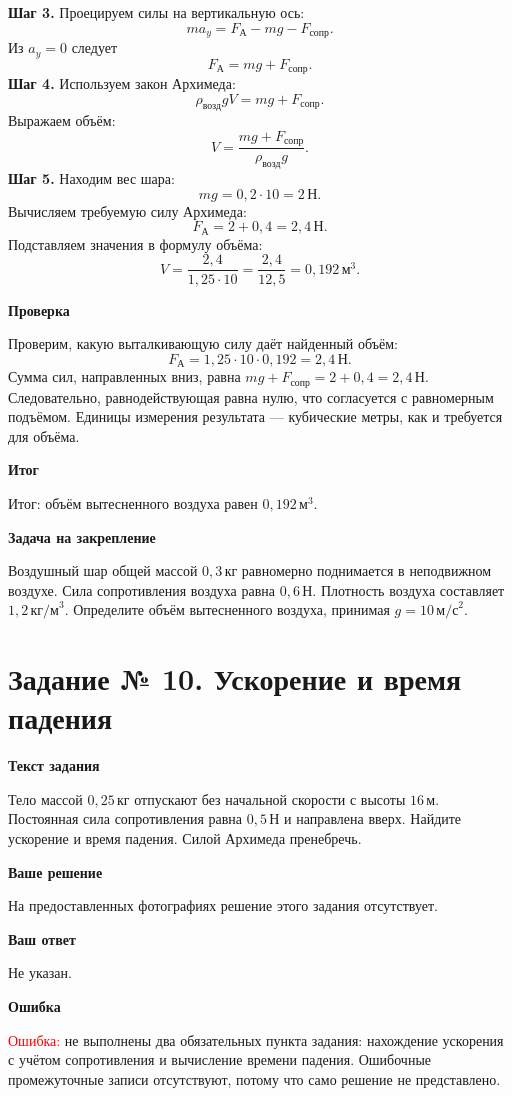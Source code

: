 \documentclass[12pt,a4paper]{article}
\newcommand{\reviewfield}[1]{\par\smallskip\noindent\textbf{#1}\par}
\newcommand{\mathunit}[1]{\,\text{#1}}
\begin{document}
\textbf{Шаг 3.} Проецируем силы на вертикальную ось:
\[
ma_y=F_{\text{А}}-mg-F_{\text{сопр}}.
\]
Из $a_y=0$ следует
\[
F_{\text{А}}=mg+F_{\text{сопр}}.
\]
\textbf{Шаг 4.} Используем закон Архимеда:
\[
\rho_{\text{возд}}gV=mg+F_{\text{сопр}}.
\]
Выражаем объём:
\[
V=\frac{mg+F_{\text{сопр}}}{\rho_{\text{возд}}g}.
\]
\textbf{Шаг 5.} Находим вес шара:
\[
mg=0{,}2\cdot10=2\mathunit{Н}.
\]
Вычисляем требуемую силу Архимеда:
\[
F_{\text{А}}=2+0{,}4=2{,}4\mathunit{Н}.
\]
Подставляем значения в формулу объёма:
\[
V=\frac{2{,}4}{1{,}25\cdot10}
 =\frac{2{,}4}{12{,}5}
 =0{,}192\,\text{м}^{3}.
\]

\reviewfield{Проверка}
Проверим, какую выталкивающую силу даёт найденный объём:
\[
F_{\text{А}}=1{,}25\cdot10\cdot0{,}192=2{,}4\mathunit{Н}.
\]
Сумма сил, направленных вниз, равна $mg+F_{\text{сопр}}=2+0{,}4=2{,}4\mathunit{Н}$. Следовательно, равнодействующая равна нулю, что согласуется с равномерным подъёмом. Единицы измерения результата --- кубические метры, как и требуется для объёма.

\reviewfield{Итог}
\textcolor{teal!60!black}{Итог:} объём вытесненного воздуха равен $0{,}192\,\text{м}^{3}$.

\reviewfield{Задача на закрепление}
Воздушный шар общей массой $0{,}3\mathunit{кг}$ равномерно поднимается в неподвижном воздухе. Сила сопротивления воздуха равна $0{,}6\mathunit{Н}$. Плотность воздуха составляет $1{,}2\,\text{кг/м}^{3}$. Определите объём вытесненного воздуха, принимая $g=10\,\text{м/с}^{2}$.
\newpage

\label{task:10}
\section*{Задание № 10. Ускорение и время падения}
\reviewfield{Текст задания}
Тело массой $0{,}25\mathunit{кг}$ отпускают без начальной скорости с высоты $16\mathunit{м}$. Постоянная сила сопротивления равна $0{,}5\mathunit{Н}$ и направлена вверх. Найдите ускорение и время падения. Силой Архимеда пренебречь.

\reviewfield{Ваше решение}
На предоставленных фотографиях решение этого задания отсутствует.

\reviewfield{Ваш ответ}
Не указан.

\reviewfield{Ошибка}
\textcolor{red}{Ошибка:} не выполнены два обязательных пункта задания: нахождение ускорения с учётом сопротивления и вычисление времени падения. Ошибочные промежуточные записи отсутствуют, потому что само решение не представлено.
\end{document}
